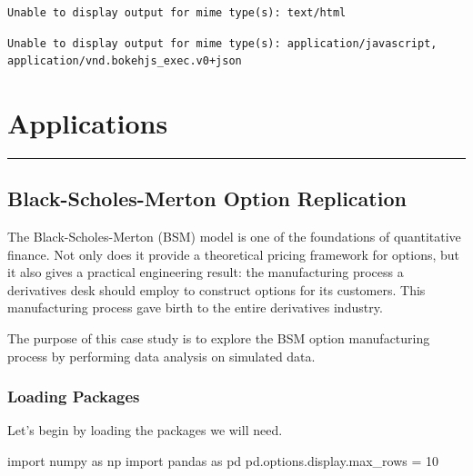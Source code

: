\documentclass[
  letterpaper,
  DIV=11,
  numbers=noendperiod]{scrreprt}
\newenvironment{Shaded}{\begin{snugshade}}{\end{snugshade}}
\newcommand{\DecValTok}[1]{\textcolor[rgb]{0.68,0.00,0.00}{#1}}
\newcommand{\ImportTok}[1]{\textcolor[rgb]{0.00,0.46,0.62}{#1}}
\newcommand{\NormalTok}[1]{\textcolor[rgb]{0.00,0.23,0.31}{#1}}
\newcommand{\OperatorTok}[1]{\textcolor[rgb]{0.37,0.37,0.37}{#1}}
\begin{document}
\begin{verbatim}
Unable to display output for mime type(s): text/html
\end{verbatim}

\begin{verbatim}
Unable to display output for mime type(s): application/javascript, application/vnd.bokehjs_exec.v0+json
\end{verbatim}

\part{Applications}

\begin{center}\rule{0.5\linewidth}{0.5pt}\end{center}

\hypertarget{black-scholes-merton-option-replication}{%
\chapter{Black-Scholes-Merton Option
Replication}\label{black-scholes-merton-option-replication}}

The Black-Scholes-Merton (BSM) model is one of the foundations of
quantitative finance. Not only does it provide a theoretical pricing
framework for options, but it also gives a practical engineering result:
the manufacturing process a derivatives desk should employ to construct
options for its customers. This manufacturing process gave birth to the
entire derivatives industry.

The purpose of this case study is to explore the BSM option
manufacturing process by performing data analysis on simulated data.

\hypertarget{loading-packages-6}{%
\section{Loading Packages}\label{loading-packages-6}}

Let's begin by loading the packages we will need.

\begin{Shaded}
\begin{Highlighting}[]
\ImportTok{import}\NormalTok{ numpy }\ImportTok{as}\NormalTok{ np}
\ImportTok{import}\NormalTok{ pandas }\ImportTok{as}\NormalTok{ pd}
\NormalTok{pd.options.display.max\_rows }\OperatorTok{=} \DecValTok{10}
\end{Highlighting}
\end{Shaded}
\end{document}
